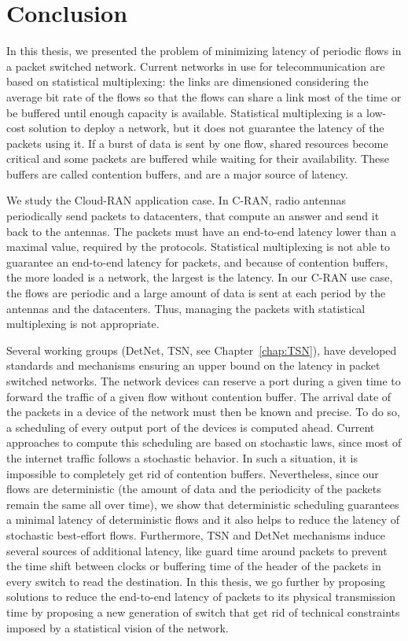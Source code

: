 
\chapter*{Conclusion}
\label{chap:concl}

In this thesis, we presented the problem of minimizing latency of periodic flows in a packet switched network. Current networks in use for telecommunication are based on statistical multiplexing: the links are dimensioned considering the average bit rate of the flows so that the flows can share a link most of the time or be buffered until enough capacity is available. Statistical multiplexing is a low-cost solution to deploy a network, but it does not guarantee the latency of the packets using it. If a burst of data is sent by one flow, shared resources become critical and some packets are buffered while waiting for their availability. These buffers are called contention buffers, and are a major source of latency.

We study the Cloud-RAN application case. In C-RAN, radio antennas periodically send packets to datacenters, that compute an answer and send it back to the antennas. The packets must have an end-to-end latency lower than a maximal value, required by the protocols. Statistical multiplexing is not able to guarantee an end-to-end latency for packets, and because of contention buffers, the more loaded is a network, the largest is the latency. In our C-RAN use case, the flows are periodic and a large amount of data is sent at each period by the antennas and the datacenters. Thus, managing the packets with statistical multiplexing is not appropriate.

Several working groups (DetNet, TSN, see Chapter~\ref{chap:TSN}), have developed standards and mechanisms ensuring an upper bound on the latency in packet switched networks. The network devices can reserve a port during a given time to forward the traffic of a given flow without contention buffer. The arrival date of the packets in a device of the network must then be known and precise. To do so, a scheduling of every output port of the devices is computed ahead. Current approaches to compute this scheduling are based on stochastic laws, since most of the internet traffic follows a stochastic behavior. In such a situation, it is impossible to completely get rid of contention buffers. Nevertheless, since our flows are deterministic (the amount of data and the periodicity of the packets remain the same all over time), we show that deterministic scheduling guarantees a minimal latency of deterministic flows and it also helps to reduce the latency of stochastic best-effort flows. 
Furthermore, TSN and DetNet mechanisms induce several sources of additional latency, like guard time around packets to prevent the time shift between clocks or buffering time of the header of the packets in every switch to read the destination. In this thesis, we go further by proposing solutions to reduce the end-to-end latency of packets to its physical transmission time by proposing a new generation of switch that get rid of technical constraints imposed by a statistical vision of the network.


